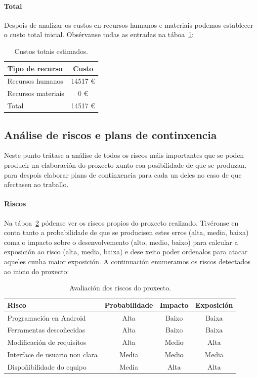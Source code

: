 \paragraph{Total}
Despois de analizar os custos en recursos humanos e materiais podemos establecer o custo total inicial. Obsérvanse todas as entradas na táboa~\ref{tab:custoTotalEstimado}:

\begin{table} [tbh]
	\footnotesize
	\centering
	\begin{tabular}{|l|c|}
		\hline 
		\textbf{Tipo de recurso} & \textbf{Custo} \\ 
		\hline 
		Recursos humanos & 14517 € \\ 
		\hline 
		Recursos materiais & 0 € \\ 
		\hline 
		Total & 14517 € \\ 
		\hline 
	\end{tabular}
	\caption{Custos totais estimados.}
	\label{tab:custoTotalEstimado}
\end{table}

\subsection{Análise de riscos e plans de continxencia}
Neste punto trátase a análise de todos os riscos máis importantes que se poden producir na elaboración do proxecto xunto coa posibilidade de que se produzan, para despois elaborar plans de continxencia para cada un deles no caso de que afectasen ao traballo.

\paragraph{Riscos}
Na táboa~\ref{tab:riscos} pódense ver os riscos propios do proxecto realizado. Tivéronse en conta tanto a probabilidade de que se producisen estes erros (alta, media, baixa) coma o impacto sobre o desenvolvemento (alto, medio, baixo) para calcular a exposición ao risco (alta, media, baixa) e dese xeito poder ordenalos para atacar aqueles cunha maior exposición.
A continuación enumeramos os riscos detectados ao inicio do proxecto:

\begin{table} [tbh]
	\footnotesize
	\centering
	\begin{tabular}{|l|c|c|c|}
		\hline 
		\textbf{Risco} & \textbf{Probabilidade} & \textbf{Impacto} & \textbf{Exposición} \\ 
		\hline 
		Programación en Android & Alta & Baixo & Baixa \\ 
		\hline 
		Ferramentas descoñecidas & Alta & Baixo & Baixa \\ 
		\hline 
		Modificación de requisitos & Alta & Medio & Alta \\ 
		\hline 
		Interface de usuario non clara & Media & Medio & Media \\ 
		\hline 
		Dispoñibilidade do equipo & Media & Alta & Alta \\ 
		\hline 
	\end{tabular}
	\caption{Avaliación dos riscos do proxecto.}
	\label{tab:riscos}
\end{table}

